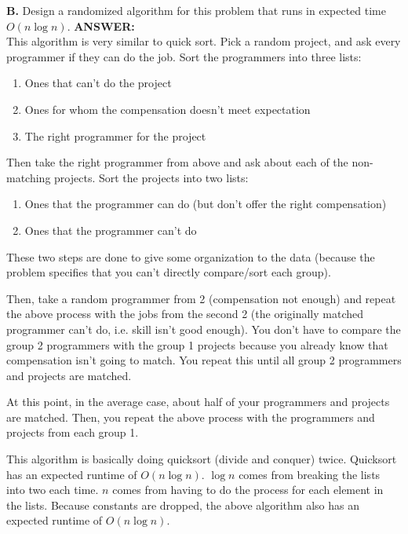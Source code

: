 \documentclass{article}
\begin{document}
{\bf B.}  Design a randomized algorithm for this problem that runs in
expected time $O ( n \log{n} )$.
{\bfseries ANSWER: }\\
This algorithm is very similar to quick sort. Pick a random project, and ask every programmer if they can do the job. Sort the programmers into three lists:
\begin{enumerate}
\item Ones that can't do the project
\item Ones for whom the compensation doesn't meet expectation
\item The right programmer for the project
\end{enumerate}
Then take the right programmer from above and ask about each of the non-matching projects. Sort the projects into two lists:
\begin{enumerate}
\item Ones that the programmer can do (but don't offer the right compensation)
\item Ones that the programmer can't do
\end{enumerate}
These two steps are done to give some organization to the data (because the problem specifies that you can't directly compare/sort each group).





Then, take a random programmer from 2 (compensation not enough) and repeat the above process with the jobs from the second 2 (the originally matched programmer can't do, i.e. skill isn't good enough). You don't have to compare the group 2 programmers with the group 1 projects because you already know that compensation isn't going to match. You repeat this until all group 2 programmers and projects are matched.





At this point, in the average case, about half of your programmers and projects are matched. Then, you repeat the above process with the programmers and projects from each group 1.





This algorithm is basically doing quicksort (divide and conquer) twice. Quicksort has an expected runtime of $O(n \log n)$. $\log n$ comes from breaking the lists into two each time. $n$ comes from having to do the process for each element in the lists. Because constants are dropped, the above algorithm also has an expected runtime of $O(n \log n)$.
\newpage
\end{document}
